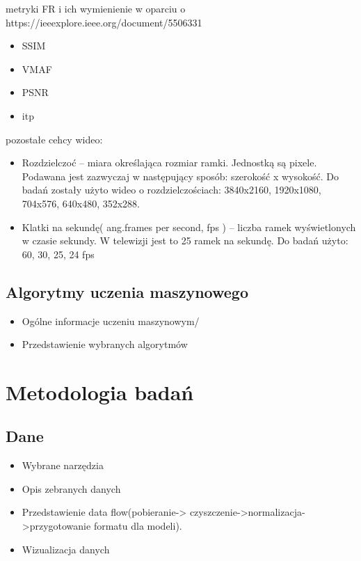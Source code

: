 metryki FR i ich wymienienie w oparciu o https://ieeexplore.ieee.org/document/5506331

\begin{itemize}[label=$\bullet$]
\item SSIM
\item VMAF
\item PSNR
\item itp
\end{itemize}

pozostałe cehcy wideo: 

\begin{itemize}[label=$\bullet$]
\item Rozdzielczoć -- miara określająca rozmiar ramki. Jednostką są pixele. Podawana jest zazwyczaj w następujący sposób: szerokość x wysokość. Do badań zostały użyto wideo o rozdzielczościach: 3840x2160, 1920x1080, 704x576, 640x480, 352x288. 
\item Klatki na sekundę( ang.frames per second, fps ) -- liczba ramek wyświetlonych w czasie sekundy. W telewizji jest to 25 ramek na sekundę. Do badań użyto: 60, 30, 25, 24 fps
\end{itemize}

\section{Algorytmy uczenia maszynowego }
\label{cha:pierwszyDokument}

\begin{itemize}
\item Ogólne informacje uczeniu maszynowym/
\item Przedstawienie wybranych algorytmów 
\end{itemize}

\chapter{Metodologia badań}
\label{cha:pierwszyDokument}

\section{Dane}
\label{cha:pierwszyDokument}

\begin{itemize}
\item Wybrane narzędzia
\item Opis zebranych danych
\item Przedstawienie data flow(pobieranie-> czyszczenie->normalizacja->przygotowanie formatu dla modeli).
\item Wizualizacja danych
\end{itemize}


